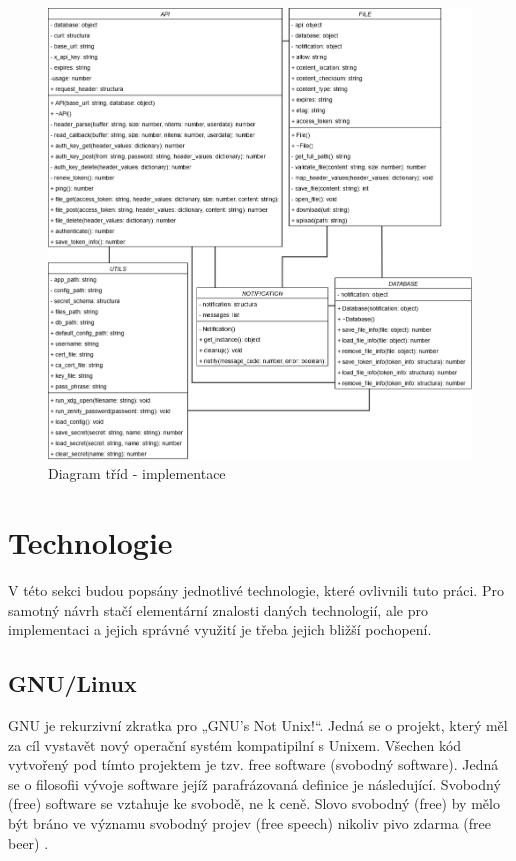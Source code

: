 \newpage

\begin{figure}[h]
    \includegraphics[width=1\linewidth]{other-fig/class_diagram_after_implementation.png}
    \caption{Diagram tříd - implementace}
    \label{fig:class_diagram_implementation}
\end{figure}

\section{Technologie}

V této sekci budou popsány jednotlivé technologie, které ovlivnili tuto práci. Pro samotný návrh stačí elementární znalosti daných technologií, ale pro
implementaci a jejich správné využití je třeba jejich bližší pochopení.

\subsection{GNU/Linux}

GNU je rekurzivní zkratka pro „GNU's Not Unix!“. Jedná se o projekt, který měl za cíl vystavět nový operační systém kompatipilní s Unixem. Všechen kód vytvořený pod
tímto projektem je tzv. free software (svobodný software). Jedná se o filosofii vývoje software jejíž parafrázovaná definice je následující. Svobodný (free) software se
vztahuje ke svobodě, ne k ceně. Slovo svobodný (free) by mělo být bráno ve významu svobodný projev (free speech) nikoliv pivo zdarma (free beer) \cite{FreeSoftware}.

